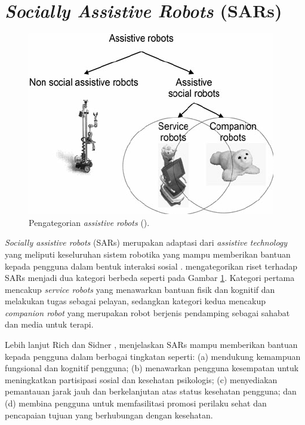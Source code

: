 \section{\emph{Socially Assistive Robots} (SARs)}
\label{sec:sociallyassistiverobots}

\begin{figure}[ht]
  \centering
  \includegraphics[scale=0.35]{gambar/kategori-sars.png}
  \caption{Pengategorian \emph{assistive robots} (\citet{cit:heerink2010}).}
  \label{fig:kategorisars}
\end{figure}

\emph{Socially assistive robots} (SARs) merupakan adaptasi dari \emph{assistive technology} yang meliputi keseluruhan sistem robotika yang mampu memberikan bantuan kepada pengguna dalam bentuk interaksi sosial \citep{cit:seifer2005}. \citet{cit:heerink2010} mengategorikan riset terhadap SARs menjadi dua kategori berbeda seperti pada Gambar \ref{fig:kategorisars}.
Kategori pertama mencakup \emph{service robots} yang menawarkan bantuan fisik dan kognitif dan melakukan tugas sebagai pelayan, sedangkan kategori kedua mencakup \emph{companion robot} yang merupakan robot berjenis pendamping sebagai sahabat dan media untuk terapi.

Lebih lanjut Rich dan Sidner \citep{cit:rich2009}, menjelaskan SARs mampu memberikan bantuan kepada pengguna dalam berbagai tingkatan seperti:
(a) mendukung kemampuan fungsional dan kognitif pengguna;
(b) menawarkan pengguna kesempatan untuk meningkatkan partisipasi sosial dan kesehatan psikologis;
(c) menyediakan pemantauan jarak jauh dan berkelanjutan atas status kesehatan pengguna;
dan (d) membina pengguna untuk memfasilitasi promosi perilaku sehat dan pencapaian tujuan yang berhubungan dengan kesehatan.
